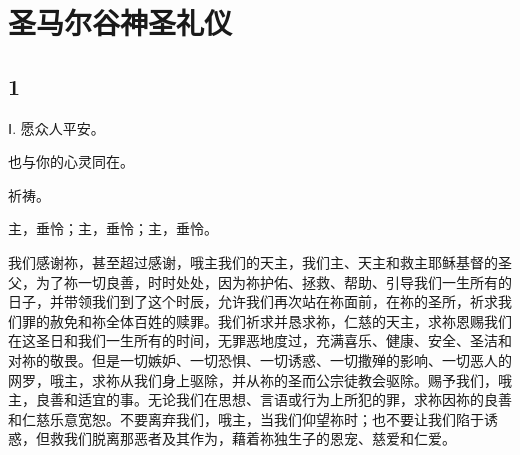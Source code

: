
\chapter{圣马尔谷神圣礼仪}



\section{1}

\par

\par

Ⅰ. 愿众人平安。\par

\par

也与你的心灵同在。\par

\par

祈祷。\par

\par

主，垂怜；主，垂怜；主，垂怜。\par

\par

我们感谢祢，甚至超过感谢，哦主我们的天主，我们主、天主和救主耶稣基督的圣父，为了祢一切良善，时时处处，因为祢护佑、拯救、帮助、引导我们一生所有的日子，并带领我们到了这个时辰，允许我们再次站在祢面前，在祢的圣所，祈求我们罪的赦免和祢全体百姓的赎罪。我们祈求并恳求祢，仁慈的天主，求祢恩赐我们在这圣日和我们一生所有的时间，无罪恶地度过，充满喜乐、健康、安全、圣洁和对祢的敬畏。但是一切嫉妒、一切恐惧、一切诱惑、一切撒殚的影响、一切恶人的网罗，哦主，求祢从我们身上驱除，并从祢的圣而公宗徒教会驱除。赐予我们，哦主，良善和适宜的事。无论我们在思想、言语或行为上所犯的罪，求祢因祢的良善和仁慈乐意宽恕。不要离弃我们，哦主，当我们仰望祢时；也不要让我们陷于诱惑，但救我们脱离那恶者及其作为，藉着祢独生子的恩宠、慈爱和仁爱。\par

